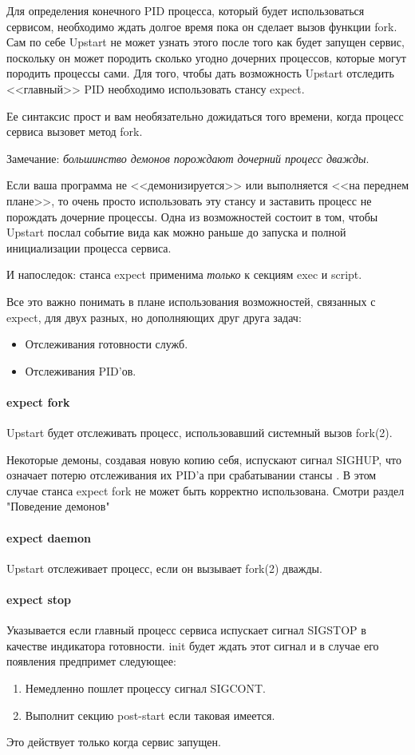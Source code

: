 Для определения конечного PID процесса, который будет использоваться сервисом, необходимо ждать долгое время пока он сделает вызов функции fork. Сам по себе Upstart не может узнать этого после того как будет запущен сервис, поскольку он может породить сколько угодно дочерних процессов, которые могут породить процессы сами. Для того, чтобы дать возможность Upstart отследить <<главный>> PID необходимо использовать стансу expect.

Ее синтаксис прост и вам необязательно дожидаться того времени, когда процесс сервиса вызовет метод fork.

Замечание: \textit{большинство демонов порождают дочерний процесс дважды}.

Если ваша программа не <<демонизируется>> или выполняется <<на переднем плане>>, то очень просто использовать эту стансу и заставить процесс не порождать дочерние процессы. Одна из возможностей состоит в том, чтобы Upstart послал событие вида  как можно раньше до запуска и полной инициализации процесса сервиса. 

И напоследок: станса expect применима \textit{только} к секциям exec и script.

Все это важно понимать в плане использования возможностей, связанных с expect, для двух разных, но дополняющих друг друга задач: \begin{itemize}
\item Отслеживания готовности служб.
\item Отслеживания PID'ов. 
\end{itemize} 
\paragraph{expect fork}
Upstart будет отслеживать процесс, использовавший системный вызов fork(2).

Некоторые демоны, создавая новую копию себя, испускают сигнал SIGHUP, что означает потерю отслеживания их PID'а при срабатывании стансы . В этом случае станса expect fork не может быть корректно использована. Смотри раздел "Поведение демонов" %
\paragraph{expect daemon}
Upstart отслеживает процесс, если он вызывает fork(2) дважды.
\paragraph{expect stop}
Указывается если главный процесс сервиса испускает сигнал SIGSTOP в качестве индикатора готовности. init будет ждать этот сигнал и в случае его появления предпримет следующее: \begin{enumerate}
\item Немедленно пошлет процессу сигнал SIGCONT.
\item Выполнит секцию post-start если таковая имеется.
\end{enumerate}
Это действует только когда сервис запущен.

